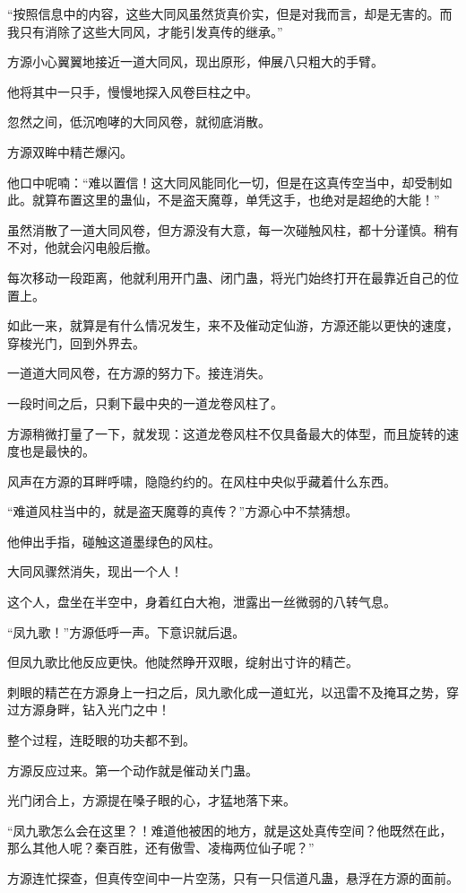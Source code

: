 \begin{this_body}
“按照信息中的内容，这些大同风虽然货真价实，但是对我而言，却是无害的。而我只有消除了这些大同风，才能引发真传的继承。”

方源小心翼翼地接近一道大同风，现出原形，伸展八只粗大的手臂。

他将其中一只手，慢慢地探入风卷巨柱之中。

忽然之间，低沉咆哮的大同风卷，就彻底消散。

方源双眸中精芒爆闪。

他口中呢喃：“难以置信！这大同风能同化一切，但是在这真传空当中，却受制如此。就算布置这里的蛊仙，不是盗天魔尊，单凭这手，也绝对是超绝的大能！”

虽然消散了一道大同风卷，但方源没有大意，每一次碰触风柱，都十分谨慎。稍有不对，他就会闪电般后撤。

每次移动一段距离，他就利用开门蛊、闭门蛊，将光门始终打开在最靠近自己的位置上。

如此一来，就算是有什么情况发生，来不及催动定仙游，方源还能以更快的速度，穿梭光门，回到外界去。

一道道大同风卷，在方源的努力下。接连消失。

一段时间之后，只剩下最中央的一道龙卷风柱了。

方源稍微打量了一下，就发现：这道龙卷风柱不仅具备最大的体型，而且旋转的速度也是最快的。

风声在方源的耳畔呼啸，隐隐约约的。在风柱中央似乎藏着什么东西。

“难道风柱当中的，就是盗天魔尊的真传？”方源心中不禁猜想。

他伸出手指，碰触这道墨绿色的风柱。

大同风骤然消失，现出一个人！

这个人，盘坐在半空中，身着红白大袍，泄露出一丝微弱的八转气息。

“凤九歌！”方源低呼一声。下意识就后退。

但凤九歌比他反应更快。他陡然睁开双眼，绽射出寸许的精芒。

刺眼的精芒在方源身上一扫之后，凤九歌化成一道虹光，以迅雷不及掩耳之势，穿过方源身畔，钻入光门之中！

整个过程，连眨眼的功夫都不到。

方源反应过来。第一个动作就是催动关门蛊。

光门闭合上，方源提在嗓子眼的心，才猛地落下来。

“凤九歌怎么会在这里？！难道他被困的地方，就是这处真传空间？他既然在此，那么其他人呢？秦百胜，还有傲雪、凌梅两位仙子呢？”

方源连忙探查，但真传空间中一片空荡，只有一只信道凡蛊，悬浮在方源的面前。


\end{this_body}
